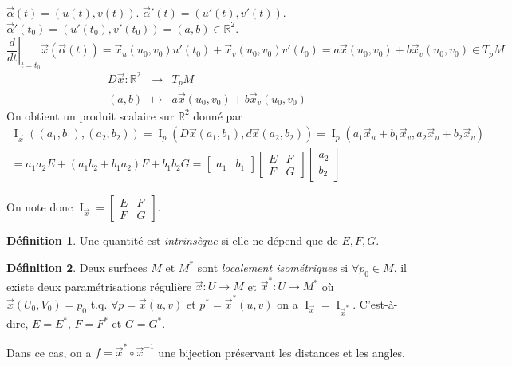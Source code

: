 \documentclass{report}
\theoremstyle{definition}
\newtheorem*{dfn}{D\'efinition}
\theoremstyle{remark}
\def\RR{\mathbb{R}}
\def\pff{\operatorname{I}}
\begin{document}
	$\vec\alpha(t) = (u(t),v(t))$. $\vec\alpha'(t) = (u'(t),v'(t))$. $\vec\alpha'(t_0) = (u'(t_0),v'(t_0)) = (a,b)\in\RR^2$.
	\[ \left. \frac{d}{dt} \right|_{t=t_0} \vec x(\vec\alpha(t)) = \vec x_u(u_0,v_0)u'(t_0) + \vec x_v(u_0,v_0)v'(t_0) = a\vec x(u_0,v_0) + b\vec x_v(u_0,v_0) \in T_pM \]
	\[ \begin{array}{rcl}
		D\vec x:\RR^2&\to& T_pM\\
		(a,b)&\mapsto&a\vec x(u_0,v_0) + b\vec x_v(u_0,v_0)
	\end{array} \]
	On obtient un produit scalaire sur $\RR^2$ donn\'e par
	\begin{multline*}
		\pff_{\vec x}((a_1,b_1),(a_2,b_2)) = \pff_p(D\vec x(a_1,b_1), d\vec x(a_2,b_2)) = \pff_p(a_1\vec x_u+b_1\vec x_v, a_2\vec x_u+b_2\vec x_v)\\
		= a_1a_2E + (a_1b_2+b_1a_2)F + b_1b_2G = \begin{bmatrix}
			a_1&b_1
		\end{bmatrix} \begin{bmatrix}
			E&F\\F&G
		\end{bmatrix} \begin{bmatrix}
			a_2\\b_2
		\end{bmatrix}
	\end{multline*}

	On note donc $\pff_{\vec x} = \begin{bmatrix}
		E&F\\F&G
	\end{bmatrix}$.

	\begin{dfn}
		Une quantit\'e est \emph{intrins\`eque} si elle ne d\'epend que de $E, F, G$.
	\end{dfn}

	\begin{dfn}
		Deux surfaces $M$ et $M^*$ sont \emph{localement isom\'etriques} si $\forall p_0\in M$, il existe deux param\'etrisations r\'eguli\`ere $\vec x:U\to M$ et $\vec x^*:U\to M^*$ o\`u $\vec x(U_0,V_0)=p_0$ t.q. $\forall p=\vec x(u,v)$ et $p^*=\vec x^*(u,v)$ on a $\pff_{\vec x}=\pff_{\vec x^*}$. C'est-\`a-dire, $E=E^*$, $F=F^*$ et $G=G^*$.

		Dans ce cas, on a $f=\vec x^* \circ \vec x^{-1}$ une bijection pr\'eservant les distances et les angles.
	\end{dfn}
\end{document}
